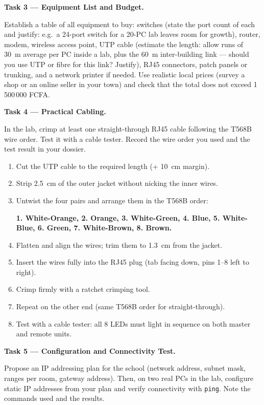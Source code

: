 \documentclass[11pt]{article}
\begin{document}
\textbf{Task 3 — Equipment List and Budget.}\par
Establish a table of all equipment to buy: switches (state the port count of each and justify: e.g.\ a 24-port switch for a 20-PC lab leaves room for growth), router, modem, wireless access point, UTP cable (estimate the length: allow runs of \SI{30}{m} average per PC inside a lab, plus the \SI{60}{m} inter-building link — should you use UTP or fibre for this link? Justify), RJ45 connectors, patch panels or trunking, and a network printer if needed. Use realistic local prices (survey a shop or an online seller in your town) and check that the total does not exceed 1\,500\,000 FCFA.

\textbf{Task 4 — Practical Cabling.}\par
In the lab, crimp at least one straight-through RJ45 cable following the T568B wire order. Test it with a cable tester. Record the wire order you used and the test result in your dossier.

\begin{methode}
\begin{enumerate}
\item Cut the UTP cable to the required length (+ \SI{10}{cm} margin).
\item Strip \SI{2.5}{cm} of the outer jacket without nicking the inner wires.
\item Untwist the four pairs and arrange them in the T568B order:\par
\textbf{1. White-Orange, 2. Orange, 3. White-Green, 4. Blue, 5. White-Blue, 6. Green, 7. White-Brown, 8. Brown.}
\item Flatten and align the wires; trim them to \SI{1.3}{cm} from the jacket.
\item Insert the wires fully into the RJ45 plug (tab facing down, pins 1–8 left to right).
\item Crimp firmly with a ratchet crimping tool.
\item Repeat on the other end (same T568B order for straight-through).
\item Test with a cable tester: all 8 LEDs must light in sequence on both master and remote units.
\end{enumerate}
\end{methode}

\textbf{Task 5 — Configuration and Connectivity Test.}\par
Propose an IP addressing plan for the school (network address, subnet mask, ranges per room, gateway address). Then, on two real PCs in the lab, configure static IP addresses from your plan and verify connectivity with \texttt{ping}. Note the commands used and the results.
\end{document}
